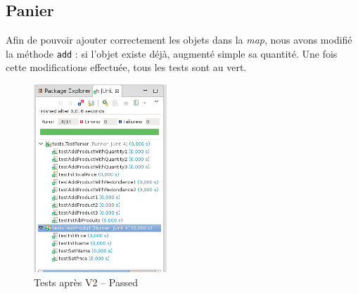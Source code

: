 \documentclass[a4paper, 11pt]{article}
\begin{document}
	\subsection{Panier}
	Afin de pouvoir ajouter correctement les objets dans la \textit{map}, nous avons modifié la méthode \texttt{add} : si l'objet existe déjà, augmenté simple sa quantité. Une
	fois cette modifications effectuée, tous les tests sont au vert.

	\begin{figure}[H]
		\centering
		\includegraphics[width=5cm]{screen3.png}
		\caption{Tests après V2 -- Passed}
	\end{figure}

	
	
	
\end{document}
